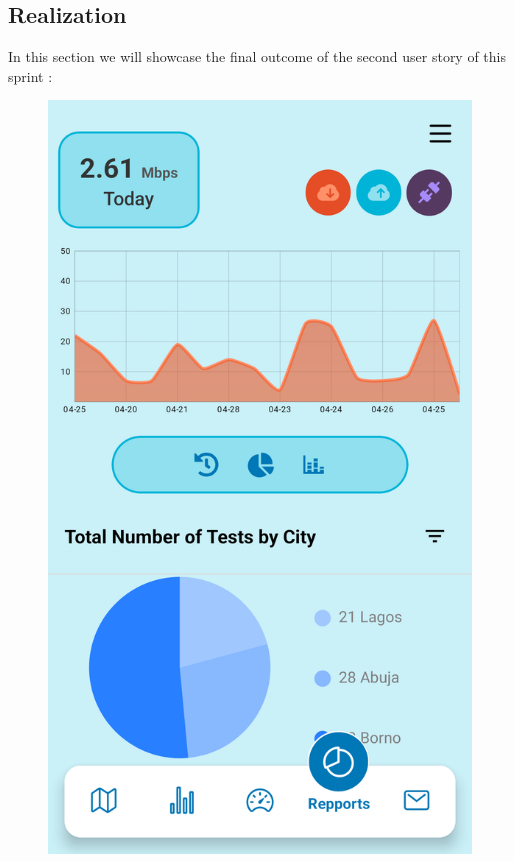 \subsection{Realization}
In this section we will showcase the final outcome of the second user story of this sprint :
\begin{figure}[H]
\begin{minipage}{0.35\textwidth}
    \centering
    \includegraphics[width=\linewidth]{images/sprint2/ReportingModule (1).png}

\end{minipage}
\end{figure}
